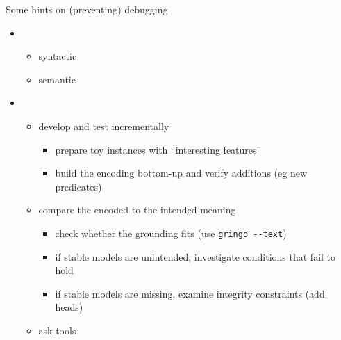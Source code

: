 \begin{frame}{Some hints on (preventing) debugging}
  \begin{itemize}
  \item {}
    \begin{itemize}
    \item syntactic \hfill{}
    \item semantic  \hfill{}
    \end{itemize}
    \bigskip
  \item<4-> 
    \begin{itemize}
    \item<4-> develop and \alert<4>{test} incrementally
      \begin{itemize}
      \item prepare toy instances with ``interesting features''
      \item build the encoding bottom-up and verify additions (eg new predicates)
      \end{itemize}
      \smallskip
    \item<5-> compare the encoded to the \alert<5>{intended meaning}
      \begin{itemize}
      \item check whether the grounding fits (use \alert<5>{\lstinline{gringo --text}})
      \item if stable models are unintended, investigate conditions that fail to hold
      \item if stable models are missing, examine integrity constraints (add heads)
      \end{itemize}
      \smallskip
    \item<6-> ask tools
  \end{itemize}
\end{itemize}
\end{frame}
